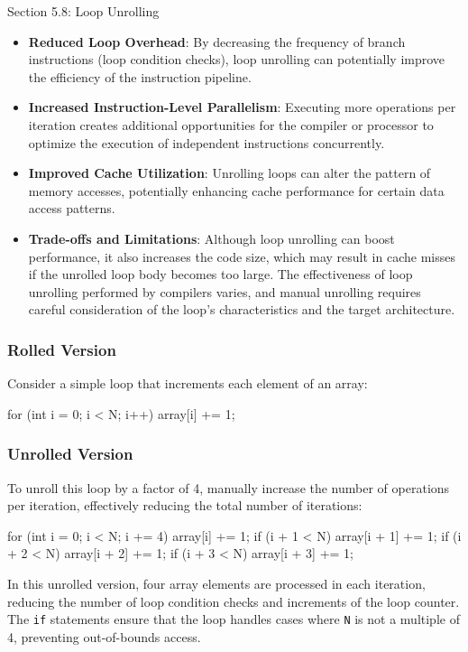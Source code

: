 \begin{notes}{Section 5.8: Loop Unrolling}
    \begin{itemize}
        \item \textbf{Reduced Loop Overhead}: By decreasing the frequency of branch instructions (loop condition checks), loop unrolling can potentially improve the efficiency of the instruction pipeline.
        \item \textbf{Increased Instruction-Level Parallelism}: Executing more operations per iteration creates additional opportunities for the compiler or processor to optimize the execution of 
        independent instructions concurrently.
        \item \textbf{Improved Cache Utilization}: Unrolling loops can alter the pattern of memory accesses, potentially enhancing cache performance for certain data access patterns.
        \item \textbf{Trade-offs and Limitations}: Although loop unrolling can boost performance, it also increases the code size, which may result in cache misses if the unrolled loop body becomes 
        too large. The effectiveness of loop unrolling performed by compilers varies, and manual unrolling requires careful consideration of the loop's characteristics and the target architecture.
    \end{itemize}

    \begin{highlight}
        \subsubsection*{Rolled Version}

        Consider a simple loop that increments each element of an array:

    \begin{code}[C]
    for (int i = 0; i < N; i++) {
        array[i] += 1;
    }
    \end{code}
        
        \subsubsection*{Unrolled Version}
        
        To unroll this loop by a factor of 4, manually increase the number of operations per iteration, effectively reducing the total number of iterations:
        
    \begin{code}[C]
    for (int i = 0; i < N; i += 4) {
        array[i] += 1;
        if (i + 1 < N) array[i + 1] += 1;
        if (i + 2 < N) array[i + 2] += 1;
        if (i + 3 < N) array[i + 3] += 1;
    }
    \end{code}
        In this unrolled version, four array elements are processed in each iteration, reducing the number of loop condition checks and increments of the loop counter. The \texttt{if} statements ensure 
        that the loop handles cases where \texttt{N} is not a multiple of 4, preventing out-of-bounds access.
    \end{highlight}
    

\end{notes}
